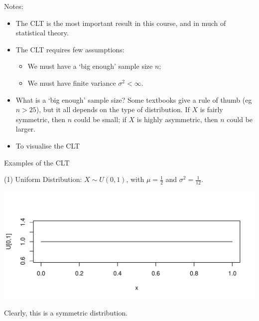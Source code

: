\documentclass[t,xcolor=pdftex,dvipsnames,table]{beamer}\usepackage[]{graphicx}\usepackage[]{color}
\makeatletter
\def\maxwidth{ %
  \ifdim\Gin@nat@width>\linewidth
    \linewidth
  \else
    \Gin@nat@width
  \fi
}
\newenvironment{knitrout}{}{} %
\makeatother
\begin{document}
\begin{frame}{}

Notes:
\begin{itemize}
\item
The CLT is the most important result in this course, and in much of statistical theory.
\item
The CLT requires few assumptions:\\
\begin{itemize}
\item We must have a `big enough' sample size $n$; \\
\item
We must have finite variance $\sigma^2< \infty$.
\end{itemize}

\item 
What is a `big enough' sample size? Some textbooks give a rule of thumb (eg $n > 25$), but it all depends on the type of distribution. If $X$ is fairly symmetric, then $n$ could be small; if $X$ is highly asymmetric, then $n$ could be larger.

\item To visualise the CLT
\href{http://www.lock5stat.com/statkey/sampling_1_quant/sampling_1_quant.html}{}
\href{http://onlinestatbook.com/stat_sim/sampling_dist/}{}
\end{itemize}
\end{frame}


\begin{frame}{Examples of the CLT}

(1) Uniform Distribution: $X \sim U(0,1)$, with $\mu = \frac{1}{2}$ and $\sigma^2=\frac{1}{12}$.  

\begin{knitrout}
\color{fgcolor}
\includegraphics[width=\maxwidth]{figure/unnamed-chunk-111-1} 

\end{knitrout}


Clearly, this is a symmetric distribution.

\end{frame}
\end{document}

